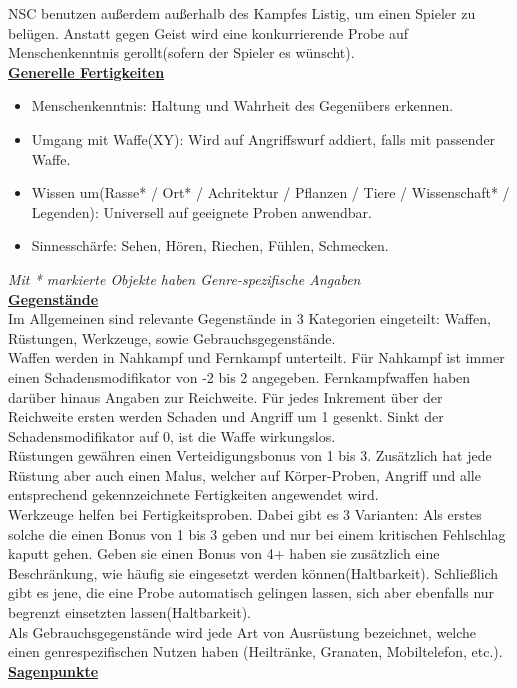 \documentclass[twoside,a4paper]{minimal}
\begin{document}
\begin{multicols*}{3}
NSC benutzen außerdem außerhalb des Kampfes Listig, um einen Spieler zu belügen. Anstatt gegen Geist wird eine konkurrierende Probe auf Menschenkenntnis gerollt(sofern der Spieler es wünscht).
\textbf{\uline{\\Generelle Fertigkeiten}}
\begin{itemize}
\item Menschenkenntnis: Haltung und Wahrheit des Gegenübers erkennen.
\item Umgang mit Waffe(XY): Wird auf Angriffswurf addiert, falls mit passender Waffe.
\item Wissen um(Rasse* / Ort* / Achritektur / Pflanzen / Tiere / Wissenschaft* / Legenden): Universell auf geeignete Proben anwendbar.
\item Sinnesschärfe: Sehen, Hören, Riechen, Fühlen, Schmecken.
\end{itemize}
\textit{Mit * markierte Objekte haben Genre-spezifische Angaben}
\textbf{\uline{\\Gegenstände}}
\\Im Allgemeinen sind relevante Gegenstände in 3 Kategorien eingeteilt: Waffen, Rüstungen, Werkzeuge, sowie Gebrauchsgegenstände.
\\Waffen werden in Nahkampf und Fernkampf unterteilt. Für Nahkampf ist immer einen Schadensmodifikator von -2 bis 2 angegeben. Fernkampfwaffen haben darüber hinaus Angaben zur Reichweite. Für jedes Inkrement über der Reichweite ersten werden Schaden und Angriff um 1 gesenkt. Sinkt der Schadensmodifikator auf 0, ist die Waffe wirkungslos.
\\Rüstungen gewähren einen Verteidigungsbonus von 1 bis 3. Zusätzlich hat jede Rüstung aber auch einen Malus, welcher auf Körper-Proben, Angriff und alle entsprechend gekennzeichnete Fertigkeiten angewendet wird.
\\Werkzeuge helfen bei Fertigkeitsproben. Dabei gibt es 3 Varianten: Als erstes solche die einen Bonus von 1 bis 3 geben und nur bei einem kritischen Fehlschlag kaputt gehen. Geben sie einen Bonus von 4+ haben sie zusätzlich eine Beschränkung, wie häufig sie eingesetzt werden können(Haltbarkeit). Schließlich gibt es jene, die eine Probe automatisch gelingen lassen, sich aber ebenfalls nur begrenzt einsetzten lassen(Haltbarkeit).
\\Als Gebrauchsgegenstände wird jede Art von Ausrüstung bezeichnet, welche einen genrespezifischen Nutzen haben (Heiltränke, Granaten, Mobiltelefon, etc.).
\textbf{\uline{\\Sagenpunkte}}

\end{multicols*}
\end{document}
